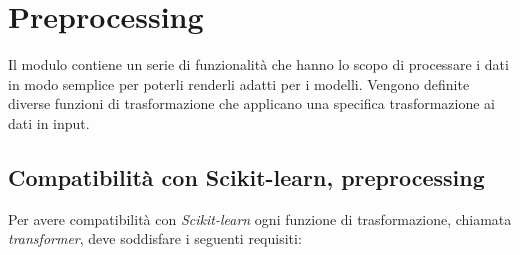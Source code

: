 \section{Preprocessing}
Il modulo contiene un serie di funzionalità che hanno lo scopo di processare i dati in modo semplice per poterli renderli adatti per i modelli. Vengono definite diverse funzioni di trasformazione che applicano una specifica trasformazione ai dati in input.

\subsection{Compatibilità con Scikit-learn, preprocessing}

Per avere compatibilità con \textit{Scikit-learn} ogni funzione di trasformazione, chiamata \textit{transformer}, deve soddisfare i seguenti requisiti:

